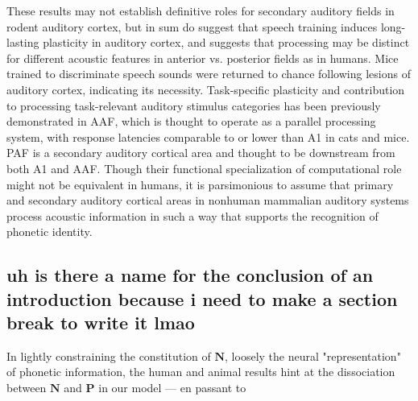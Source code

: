 These results\citep{engineerSpeechTrainingAlters2015a} may not establish definitive roles for secondary auditory fields in rodent auditory cortex, but in sum do suggest that speech training induces long-lasting plasticity in auditory cortex, and suggests that processing may be distinct for different acoustic features in anterior vs. posterior fields as in humans. Mice trained to discriminate speech sounds were returned to chance following lesions of auditory cortex\citep{saundersMiceCanLearn2019}, indicating its necessity. Task-specific plasticity\citep{takahashiLearningstagedependentFieldspecificMap2011} and contribution to processing task-relevant auditory stimulus categories\citep{shiAnteriorAuditoryField2019} has been previously demonstrated in AAF, which is thought to operate as a parallel processing system, with response latencies comparable to or lower than A1 in cats\citep{carrascoNeuronalActivationTimes2011} and mice\citep{lindenSpectrotemporalStructureReceptive2003b}. PAF is a secondary auditory cortical area and thought to be downstream from both A1 and AAF\citep{pandyaSpectralTemporalProcessing2008,carrascoEvidenceHierarchicalProcessing2009}. Though their functional specialization of computational role might not be equivalent in humans, it is parsimonious to assume that primary and secondary auditory cortical areas in nonhuman mammalian auditory systems process acoustic information in such a way that supports the recognition of phonetic identity. 


\subsection{uh is there a name for the conclusion of an introduction because i need to make a section break to write it lmao}

In lightly constraining the constitution of $\mathbf{N}$, loosely the neural "representation" of phonetic information, the human and animal results hint at the dissociation between $\mathbf{N}$ and $\mathbf{P}$ in our model --- en passant to  

